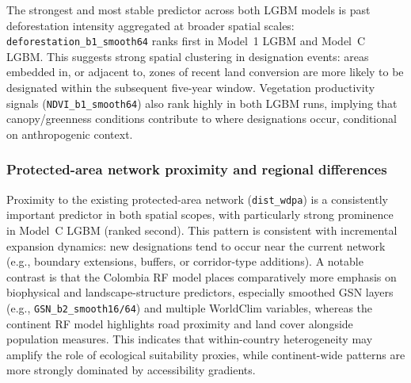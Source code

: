 \documentclass[12pt]{article}
\theoremstyle{break} %
\begin{document}
The strongest and most stable predictor across both LGBM models is past deforestation intensity aggregated at broader spatial scales: \texttt{deforestation\_b1\_smooth64} ranks first in Model~1 LGBM and Model~C LGBM. This suggests strong spatial clustering in designation events: areas embedded in, or adjacent to, zones of recent land conversion are more likely to be designated within the subsequent five-year window. Vegetation productivity signals (\texttt{NDVI\_b1\_smooth64}) also rank highly in both LGBM runs, implying that canopy/greenness conditions contribute to where designations occur, conditional on anthropogenic context.

\subsubsection*{Protected-area network proximity and regional differences}

Proximity to the existing protected-area network (\texttt{dist\_wdpa}) is a consistently important predictor in both spatial scopes, with particularly strong prominence in Model~C LGBM (ranked second). This pattern is consistent with incremental expansion dynamics: new designations tend to occur near the current network (e.g., boundary extensions, buffers, or corridor-type additions). A notable contrast is that the Colombia RF model places comparatively more emphasis on biophysical and landscape-structure predictors, especially smoothed GSN layers (e.g., \texttt{GSN\_b2\_smooth16/64}) and multiple WorldClim variables, whereas the continent RF model highlights road proximity and land cover alongside population measures. This indicates that within-country heterogeneity may amplify the role of ecological suitability proxies, while continent-wide patterns are more strongly dominated by accessibility gradients.
\end{document}
